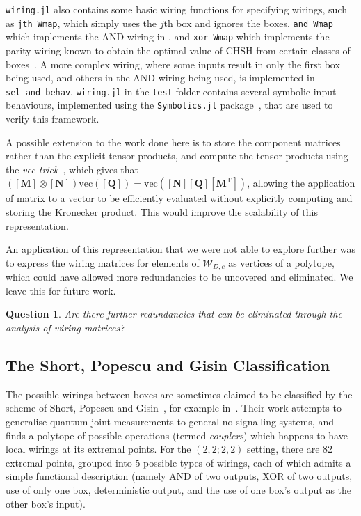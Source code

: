 \documentclass[10pt, a4paper]{article}
\numberwithin{equation}{section} %
\theoremstyle{definition}
\theoremstyle{plain}
\newtheorem{question}{Question}
\newcommand{\?}{\mathrel{?}} %
\newcommand{\tpose}{\mathrm{T}}
\newcommand{\matr}[2][]{\left[\mathbf{#2}#1\right]} %
\newcommand{\sW}{\mathcal{W}}
\begin{document}
                  \verb`wiring.jl` also contains some basic wiring functions for specifying wirings, such as \verb`jth_Wmap`, which simply uses the \(j\)th box and ignores the boxes, \verb`and_Wmap` which implements the AND wiring in , and \verb`xor_Wmap` which implements the parity wiring known to obtain the optimal value of CHSH from certain classes of boxes~\cite{OptimalNLDistillation}. A more complex wiring, where some inputs result in only the first box being used, and others in the AND wiring being used, is implemented in \verb`sel_and_behav`. \verb`wiring.jl` in the \verb`test` folder contains several symbolic input behaviours, implemented using the \verb`Symbolics.jl` package~\cite{Symbolics}, that are used to verify this framework.

                  A possible extension to the work done here is to store the component matrices rather than the explicit tensor products, and compute the tensor products using the \emph{vec trick}~\cite{VecTrick}, which gives that \((\matr{M}\otimes\matr{N})\mathrm{vec}(\matr{Q}) = \mathrm{vec}(\matr{N}\matr{Q}\matr[^\tpose]{M})\), allowing the application of matrix to a vector to be efficiently evaluated without explicitly computing and storing the Kronecker product. This would improve the scalability of this representation.

                  An application of this representation that we were not able to explore further was to express the wiring matrices for elements of \(\sW_{D,c}\) as vertices of a polytope, which could have allowed more redundancies to be uncovered and eliminated. We leave this for future work.
                  \begin{question}
                    Are there further redundancies that can be eliminated through the analysis of wiring matrices?
                  \end{question}

                  \subsection{The Short, Popescu and Gisin Classification}\label{sec:locwir_SPG}

                  The possible wirings between boxes are sometimes claimed to be classified by the scheme of Short, Popescu and Gisin~\cite{ShortEntangleSwap}, for example in~\cite{ShortClassClaim}. Their work attempts to generalise quantum joint measurements to general no-signalling systems, and finds a polytope of possible operations (termed \emph{couplers}) which happens to have local wirings at its extremal points. For the  \((2,2;2,2)\) setting, there are 82 extremal points, grouped into 5 possible types of wirings, each of which admits a simple functional description (namely AND of two outputs, XOR of two outputs, use of only one box, deterministic output, and the use of one box's output as the other box's input).
\end{document}
